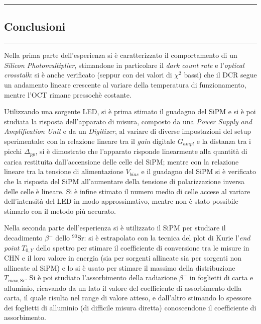 \newpage
{\color{gray}\hrule}
\begin{center}
\section{Conclusioni}
\bigskip
\end{center}
{\color{gray}\hrule}
\vspace{0.5cm}
Nella prima parte dell'esperienza si è caratterizzato il comportamento di un \textit{Silicon Photomultiplier}, stimandone in particolare il \textit{dark count rate} e l'\textit{optical crosstalk}: si è anche verificato (seppur con dei valori di $\chi^2$ bassi) che il DCR segue un andamento lineare crescente al variare della temperatura di funzionamento, mentre l'OCT rimane pressochè costante.

Utilizzando una sorgente LED, si è prima stimato il guadagno del SiPM e si è poi studiata la risposta dell'apparato di misura, composto da una \textit{Power Supply and Amplification Unit} e da un \textit{Digitizer}, al variare di diverse impostazioni del setup sperimentale: con la relazione lineare tra il \textit{gain} digitale $G_{ampl}$ e la distanza tra i picchi $\Delta_{pp}$, si è dimostrato che l'apparato risponde linearmente alla quantità di carica restituita dall'accensione delle celle del SiPM; mentre con la relazione lineare tra la tensione di alimentazione $V_{bias}$ e il guadagno del SiPM si è verificato che la risposta del SiPM all'aumentare della tensione di polarizzazione inversa delle celle è lineare. Si è infine stimato il numero medio di celle accese al variare dell'intensità del LED in modo approssimativo, mentre non è stato possibile stimarlo con il metodo più accurato.

Nella seconda parte dell'esperienza si è utilizzato il SiPM per studiare il decadimento $\beta^-$ dello ${}^{90}$Sr: si è estrapolato con la tecnica del plot di Kurie l'\textit{end point} $T_{0,Y}$ dello spettro per stimare il coefficiente di conversione tra le misure in CHN e il loro valore in energia (sia per sorgenti allineate sia per sorgenti non allineate al SiPM) e lo si è usato per stimare il massimo della distribuzione $T_{max,\text{Sr}}$. Si è poi studiato l'assorbimento della radiazione $\beta^-$ in foglietti di carta e alluminio, ricavando da un lato il valore del coefficiente di assorbimento della carta, il quale risulta nel range di valore atteso, e dall'altro stimando lo spessore dei foglietti di alluminio (di difficile misura diretta) conoscendone il coefficiente di assorbimento.

